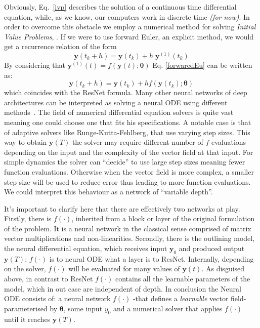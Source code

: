 \documentclass[11pt]{report}
\begin{document}
    Obviously, Eq.~\eqref{ivp} describes the solution of a continuous time differential equation, while, as we know, our
    computers work in discrete time \textit{(for now)}.
    In order to overcome this obstacle we employ a numerical method for solving \textit{Initial Value Problems}, .
    If we were to use forward Euler, an explicit method, we would get a recurrence relation of the form
    \begin{equation}
        \pmb{y}(t_k + h) = \pmb{y}(t_k) + h \; \pmb{y}^{(1)}(t_k)
        \label{forwaredEu}
    \end{equation}
    By considering that $\pmb{y}^{(1)}(t) = f(\pmb{y}(t);\pmb{\theta})$ Eq. \eqref{forwaredEu} can be written as:
    \begin{equation}
        \pmb{y}(t_k + h) = \pmb{y}(t_k) + h f(\pmb{y}(t_k); \pmb{\theta} )
        \label{res2eul}
    \end{equation}
    which coincides with the ResNet formula.
    Many other neural networks of deep architectures can be interpreted as solving a neural ODE using different methods~\cite{chen2019ordinary}.
    The field of numerical differential equation solvers is quite vast meaning one could choose one that fits his specifications.
    A notable case is that of adaptive solvers like Runge-Kutta-Fehlberg, that use varying step sizes.
    This way to obtain  $\pmb{y}(T)$ the solver may require different number of $f$ evaluations depending on the input and the complexity of the vector field at that input.
    For simple dynamics the solver can ``decide'' to use large step sizes meaning fewer function evaluations.
    Otherwise when the vector field is more complex, a smaller step size will be used to reduce error thus leading to more function evaluations.
    We could interpret this behaviour as a network of ``variable depth''.

    It's important to clarify here that there are effectively two networks at play.
    Firstly, there is $f(\cdot)$, inherited from a block or layer of the original formulation of the problem.
    It is a neural network in the classical sense comprised of matrix vector multiplications and non-linearities.
    Secondly, there is the outlining model, the neural differential equation, which receives input $\pmb{y}_0$ and produced
    output $\pmb{y}(T)$; $f(\cdot)$ is to neural ODE what a layer is to ResNet.
    Internally, depending on the solver, $f(\cdot)$ will be evaluated for many values of $\pmb{y}(t)$.
    As disguised above, in contrast to ResNet $f(\cdot)$ contains all the learnable parameters of the model,
    which in out case are independent of depth.
    In conclusion the Neural ODE consists of: a neural network $f(\cdot)$ -that defines a \textit{learnable}
    vector field- parameterised by $\pmb{\theta}$,  some input $y_0$ and a numerical solver that applies $f(\cdot)$ until it reaches $\pmb{y}(T)$.
\end{document}
